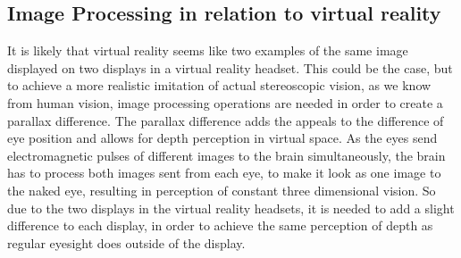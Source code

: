 		\subsection{Image Processing in relation to virtual reality}
		It is likely that virtual reality seems like two examples of the same image displayed on two displays in a virtual reality headset. This could be the case, but to achieve a more realistic imitation of actual stereoscopic vision, as we know from human vision, image processing operations are needed in order to create a parallax difference. The parallax difference adds the appeals to the difference of eye position and allows for depth perception in virtual space. As the eyes send electromagnetic pulses of different images to the brain simultaneously, the brain has to process both images sent from each eye, to make it look as one image to the naked eye, resulting in perception of constant three dimensional vision. So due to the two displays in the virtual reality headsets, it is needed to add a slight difference to each display, in order to achieve the same perception of depth as regular eyesight does outside of the display.
												
